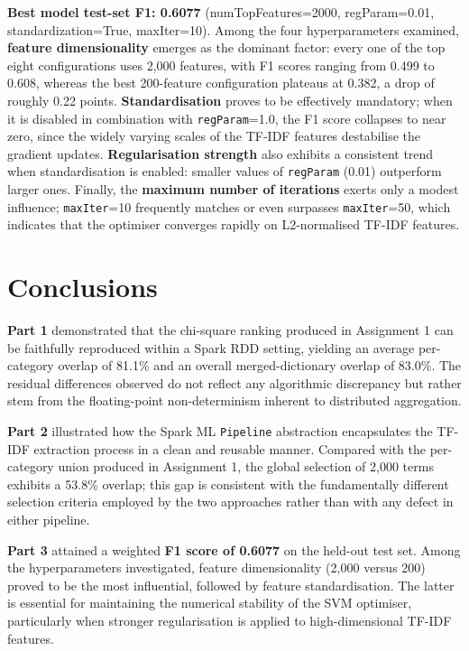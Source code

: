 \documentclass[11pt,a4paper]{extarticle}
\begin{document}
\textbf{Best model test-set F1: 0.6077} (numTopFeatures=2000, regParam=0.01, standardization=True, maxIter=10).
Among the four hyperparameters examined, \textbf{feature dimensionality} emerges as the dominant factor: every one of the top eight configurations uses 2{,}000 features, with F1 scores ranging from 0.499 to 0.608, whereas the best 200-feature configuration plateaus at 0.382, a drop of roughly 0.22 points. \textbf{Standardisation} proves to be effectively mandatory; when it is disabled in combination with \texttt{regParam}=1.0, the F1 score collapses to near zero, since the widely varying scales of the TF-IDF features destabilise the gradient updates. \textbf{Regularisation strength} also exhibits a consistent trend when standardisation is enabled: smaller values of \texttt{regParam} (0.01) outperform larger ones. Finally, the \textbf{maximum number of iterations} exerts only a modest influence; \texttt{maxIter}=10 frequently matches or even surpasses \texttt{maxIter}=50, which indicates that the optimiser converges rapidly on L2-normalised TF-IDF features.





\section{Conclusions}

\textbf{Part 1} demonstrated that the chi-square ranking produced in Assignment 1 can be faithfully reproduced within a Spark RDD setting, yielding an average per-category overlap of 81.1\% and an overall merged-dictionary overlap of 83.0\%. The residual differences observed do not reflect any algorithmic discrepancy but rather stem from the floating-point non-determinism inherent to distributed aggregation.

\textbf{Part 2} illustrated how the Spark ML \texttt{Pipeline} abstraction encapsulates the TF-IDF extraction process in a clean and reusable manner. Compared with the per-category union produced in Assignment 1, the global selection of 2{,}000 terms exhibits a 53.8\% overlap; this gap is consistent with the fundamentally different selection criteria employed by the two approaches rather than with any defect in either pipeline.

\textbf{Part 3} attained a weighted \textbf{F1 score of 0.6077} on the held-out test set. Among the hyperparameters investigated, feature dimensionality (2{,}000 versus 200) proved to be the most influential, followed by feature standardisation. The latter is essential for maintaining the numerical stability of the SVM optimiser, particularly when stronger regularisation is applied to high-dimensional TF-IDF features.
\end{document}
